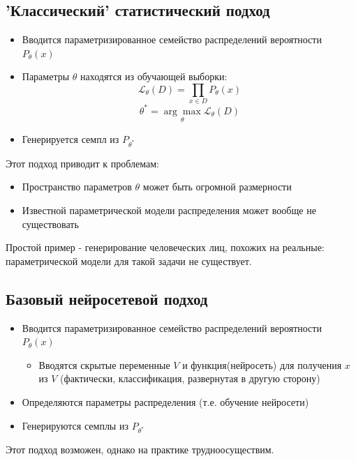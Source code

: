 \documentclass[a4paper]{article}
\begin{document}
		\subsection{'Классический' статистический подход}
			\begin{itemize}
				\item Вводится параметризированное семейство распределений вероятности $P_{\theta}(x)$
				\item Параметры $\theta$ находятся из обучающей выборки:
				$$ \mathcal{L}_{\theta}(D) = \prod_{x \in D} P_{\theta}(x) $$
				$$ \theta^{*} = \underset{\theta}{\arg\max} \mathcal{L}_{\theta}(D)$$
				\item Генерируется семпл из $ P_{\theta^{*}}$
			\end{itemize}
			Этот подход приводит к проблемам:
			\begin{itemize}
				\item Пространство параметров $\theta$ может быть огромной размерности
				\item Известной параметрической модели распределения может вообще не существовать
			\end{itemize}
			Простой пример - генерирование человеческих лиц, похожих на реальные: параметрической модели для такой задачи не существует.
		\subsection{Базовый нейросетевой подход}
			\begin{itemize}
				\item Вводится параметризированное семейство распределений вероятности $P_{\theta}(x)$
				\begin{itemize}
					\item Вводятся скрытые переменные $V$ и функция(нейросеть) для получения $x$ из $V$ (фактически, классификация, развернутая в другую сторону)
				\end{itemize}
				\item Определяются параметры распределения (т.е. обучение нейросети)
				\item Генерируются семплы из $ P_{\theta^{*}}$
			\end{itemize}
			Этот подход возможен, однако на практике трудноосуществим.
\end{document}
